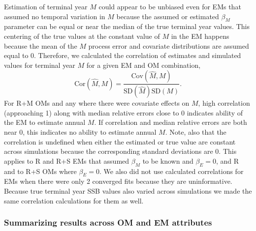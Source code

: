 \documentclass[
  12pt,
]{article}
\begin{document}
Estimation of terminal year \(M\) could appear to be unbiased even for EMs that assumed no temporal variation in \(M\) because the assumed or estimated \(\beta_M\) parameter can be equal or near the median of the true terminal year values. This centering of the true values at the constant value of \(M\) in the EM happens because the mean of the \(M\) process error and covariate distributions are assumed equal to 0. Therefore, we calculated the correlation of estimates and simulated values for terminal year \(M\) for a given EM and OM combination,
\[
\text{Cor}\left(\widehat M, M\right) = \frac{\text{Cov}\left(\widehat M, M\right)}{\text{SD}\left(\widehat M\right)\text{SD}\left(M\right)}.
\]
For R+M OMs and any where there were covariate effects on \(M\), high correlation (approaching 1) along with median relative errors close to 0 indicates ability of the EM to estimate annual \(M\). If correlation and median relative errors are both near 0, this indicates no ability to estimate annual \(M\). Note, also that the correlation is undefined when either the estimated or true value are constant across simulations because the corresponding standard deviations are 0. This applies to R and R+S EMs that assumed \(\beta_M\) to be known and \(\beta_E = 0\), and R and to R+S OMs where \(\beta_E = 0\). We also did not use calculated correlations for EMs when there were only 2 converged fits because they are uninformative. Because true terminal year SSB values also varied across simulations we made the same correlation calculations for them as well.

\subsubsection*{Summarizing results across OM and EM attributes}\label{summarizing-results-across-om-and-em-attributes}
\end{document}
